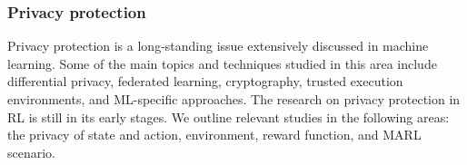 \documentclass[acmsmall]{acmart}
\begin{document}
\subsubsection{Privacy protection}

Privacy protection is a long-standing issue extensively discussed in machine learning. Some of the main topics and techniques studied in this area include differential privacy, federated learning, cryptography, trusted execution environments, and ML-specific approaches\cite{de2020overview}. The research on privacy protection in RL is still in its early stages. We outline relevant studies in the following areas: the privacy of state and action, environment, reward function, and MARL scenario. 


\end{document}

